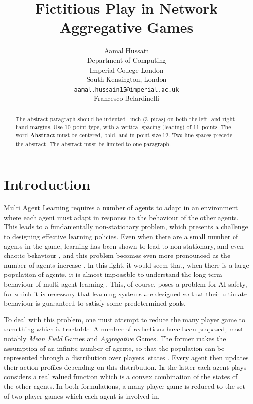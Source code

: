 \documentclass{article}
\title{Fictitious Play in Network Aggregative Games}
\author{%
 Aamal Hussain  \\
  Department of Computing\\
  Imperial College London\\
  South Kensington, London \\
  \texttt{aamal.hussain15@imperial.ac.uk} \\
  \And
  Francesco Belardinelli
}
\theoremstyle{definition}
\begin{document}
\maketitle

\begin{abstract}
  The abstract paragraph should be indented ~inch (3~picas) on
  both the left- and right-hand margins. Use 10~point type, with a vertical
  spacing (leading) of 11~points.  The word \textbf{Abstract} must be centered,
  bold, and in point size 12. Two line spaces precede the abstract. The abstract
  must be limited to one paragraph.
\end{abstract}

\section{Introduction}

Multi Agent Learning \cite{Schwartz} requires a number of agents to adapt in an environment where
each agent must adapt in response to the behaviour of the other agents. This leads to a
fundamentally non-stationary problem, which presents a challenge to designing effective learning
policies. Even when there are a small number of agents in the game, learning has been shown to lead
to non-stationary, and even chaotic behaviour \cite{SatoChaos}, and this problem becomes even more
pronounced as the number of agents increase \cite{Sanders}. In this light, it would seem that, when there is a large population of agents, it is almost impossible to understand the long term behaviour of multi agent learning \cite{PiliourasChaoticMaps}. This, of course, poses a problem for AI safety, for which it is necessary that learning systems are designed so that their ultimate behaviour is guaranteed to satisfy some predetermined goals.

To deal with this problem, one must attempt to reduce the many player game to something which is
tractable. A number of reductions have been proposed, most notably \emph{Mean Field} Games
and \emph{Aggregative} Games. The former makes the assumption of an infinite
number of agents, so that the population can be represented through a distribution over players'
states \cite{CainesPaper} . Every agent then updates their action profiles depending on this
distribution. In the latter each agent plays considers a real valued function which is a convex
combination of the states of the other agents. In both formulations, a many player game is reduced
to the set of two player games which each agent is involved in.
\end{document}
